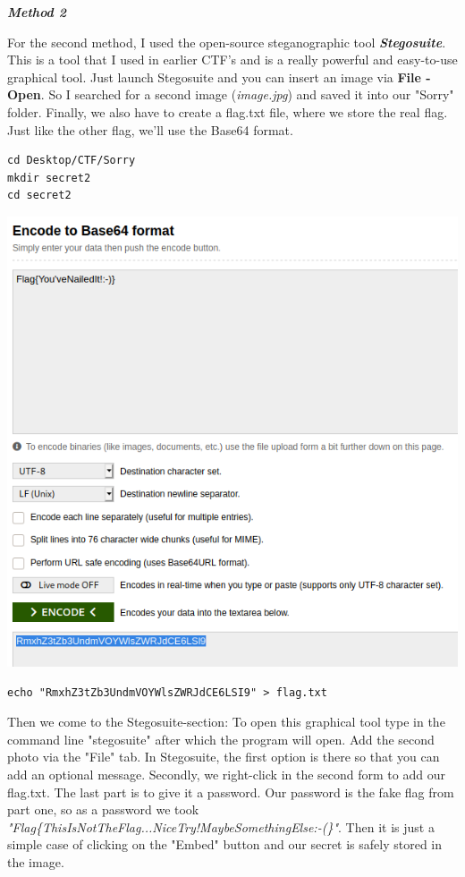\documentclass[../main.tex]{subfiles}
\begin{document}
\pagebreak
\textbf{\textit{Method 2}}

For the second method, I used the open-source steganographic tool \textbf{\textit{Stegosuite}}. This is a tool that I used in earlier CTF's and is a really powerful and easy-to-use graphical tool. Just launch Stegosuite and you can insert an image via \textbf{File - Open}. So I searched for a second image (\textit{image.jpg}) and saved it into our "Sorry" folder. Finally, we also have to create a flag.txt file, where we store the real flag. Just like the other flag, we'll use the Base64 format.

\begin{lstlisting}
cd Desktop/CTF/Sorry
mkdir secret2
cd secret2
\end{lstlisting}
\begin{center}
\includegraphics[width=1\linewidth]{images/Robbe/sorry3.png}
\end{center}
\begin{lstlisting}
echo "RmxhZ3tZb3UndmVOYWlsZWRJdCE6LSI9" > flag.txt
\end{lstlisting}

\pagebreak
Then we come to the Stegosuite-section: To open this graphical tool type in the command line "stegosuite" after which the program will open. Add the second photo via the "File" tab. In Stegosuite, the first option is there so that you can add an optional message. Secondly, we right-click in the second form to add our flag.txt. The last part is to give it a password. Our password is the fake flag from part one, so as a password we took \textit{"Flag\{ThisIsNotTheFlag...NiceTry!MaybeSomethingElse:-(\}"}. Then it is just a simple case of clicking on the "Embed" button and our secret is safely stored in the image.
\end{document}

